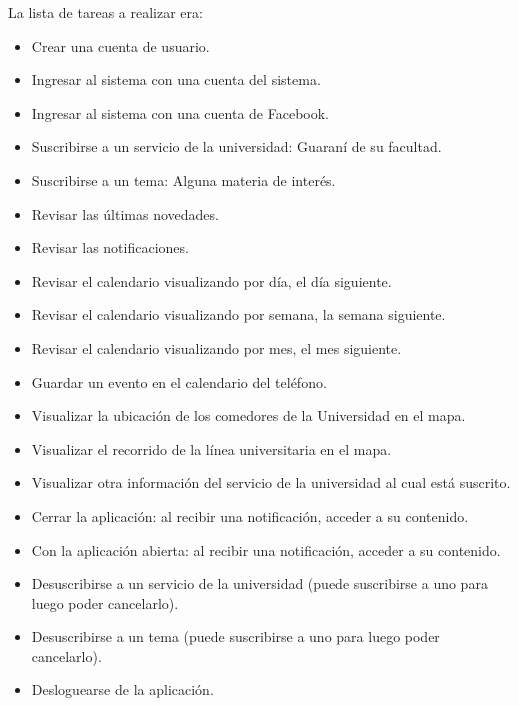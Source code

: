 La lista de tareas a realizar era:
\begin{itemize}
\item Crear una cuenta de usuario.
\item Ingresar al sistema con una cuenta del sistema.
\item Ingresar al sistema con una cuenta de Facebook.
\item Suscribirse a un servicio de la universidad: Guaraní de su facultad.
\item Suscribirse a un tema: Alguna materia de interés.
\item Revisar las últimas novedades.
\item Revisar las notificaciones.
\item Revisar el calendario visualizando por día, el día siguiente.
\item Revisar el calendario visualizando por semana, la semana siguiente.
\item Revisar el calendario visualizando por mes, el mes siguiente.
\item Guardar un evento en el calendario del teléfono.
\item Visualizar la ubicación de los comedores de la Universidad en el mapa.
\item Visualizar el recorrido de la línea universitaria en el mapa.
\item Visualizar otra información del servicio de la universidad al cual está suscrito.
\item Cerrar la aplicación: al recibir una notificación, acceder a su contenido.
\item Con la aplicación abierta: al recibir una notificación, acceder a su contenido.
\item Desuscribirse a un servicio de la universidad (puede suscribirse a uno para luego poder cancelarlo).
\item Desuscribirse a un tema (puede suscribirse a uno para luego poder cancelarlo).
\item Desloguearse de la aplicación.
\end{itemize}


